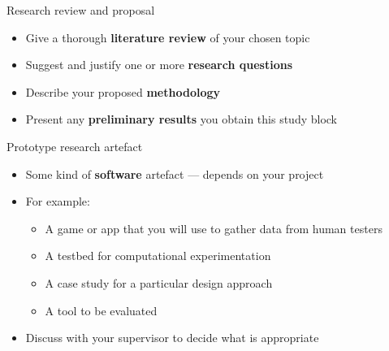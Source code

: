 \begin{frame}{Research review and proposal}
	\begin{itemize}
		\pause\item Give a thorough \textbf{literature review} of your chosen topic
		\pause\item Suggest and justify one or more \textbf{research questions}
		\pause\item Describe your proposed \textbf{methodology}
		\pause\item Present any \textbf{preliminary results} you obtain this study block
	\end{itemize}
\end{frame}

\begin{frame}{Prototype research artefact}
	\begin{itemize}
		\pause\item Some kind of \textbf{software} artefact --- depends on your project
		\pause\item For example:
			\begin{itemize}
				\pause\item A game or app that you will use to gather data from human testers
				\pause\item A testbed for computational experimentation
				\pause\item A case study for a particular design approach
				\pause\item A tool to be evaluated
			\end{itemize}
		\pause\item Discuss with your supervisor to decide what is appropriate
	\end{itemize}
\end{frame}


